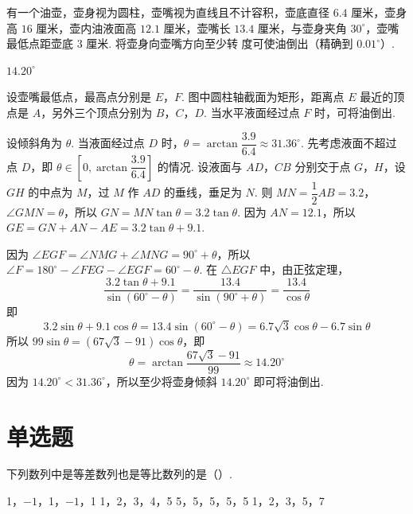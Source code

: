 \documentclass[UTF8,a4paper,oneside,11pt]{ctexbook}
\begin{document}
\begin{problem}
有一个油壶，壶身视为圆柱，壶嘴视为直线且不计容积，壶底直径 \(6.4\text{ 厘米}\)，壶身高 \(16\text{ 厘米}\)，壶内油液面高 \(12.1\text{ 厘米}\)，壶嘴长 \(13.4\text{ 厘米}\)，与壶身夹角 \(30^\circ\)，壶嘴最低点距壶底 \(3\text{ 厘米}\). 将壶身向壶嘴方向至少转\fillinblank{}\(\text{ 度}\)可使油倒出（精确到 \(0.01^\circ\)）.

\end{problem}

\begin{answer}
\(14.20^\circ\)
\end{answer}

\begin{solution}

设壶嘴最低点，最高点分别是 \(E\)，\(F\). 图中圆柱轴截面为矩形，距离点 \(E\) 最近的顶点是 \(A\)，另外三个顶点分别为 \(B\)，\(C\)，\(D\). 当水平液面经过点 \(F\) 时，可将油倒出.

设倾斜角为 \(\theta\). 当液面经过点 \(D\) 时，\(\theta=\arctan\dfrac{3.9}{6.4}\approx31.36^\circ\). 先考虑液面不超过点 \(D\)，即 \(\theta\in\left[0,\arctan\dfrac{3.9}{6.4}\right]\) 的情况. 设液面与 \(AD\)，\(CB\) 分别交于点 \(G\)，\(H\)，设 \(GH\) 的中点为 \(M\)，过 \(M\) 作 \(AD\) 的垂线，垂足为 \(N\). 则 \(MN=\dfrac12AB=3.2\)，\(\angle GMN=\theta\)，所以 \(GN=MN\tan\theta=3.2\tan\theta\). 因为 \(AN=12.1\)，所以 \(GE=GN+AN-AE=3.2\tan\theta+9.1\).

因为 \(\angle EGF=\angle NMG+\angle MNG=90^\circ+\theta\)，所以 \(\angle F=180^\circ-\angle FEG-\angle EGF=60^\circ-\theta\). 在 \(\triangle EGF\) 中，由正弦定理，
\[
\frac{3.2\tan\theta+9.1}{\sin(60^\circ-\theta)}
=\frac{13.4}{\sin(90^\circ+\theta)}
=\frac{13.4}{\cos\theta}
\]
即
\[
3.2\sin\theta+9.1\cos\theta
=13.4\sin(60^\circ-\theta)
=6.7\sqrt3\cos\theta-6.7\sin\theta
\]
所以 \(99\sin\theta=(67\sqrt3-91)\cos\theta\)，即
\[
\theta=\arctan\frac{67\sqrt3-91}{99}\approx14.20^\circ
\]
因为 \(14.20^\circ<31.36^\circ\)，所以至少将壶身倾斜 \(14.20^\circ\) 即可将油倒出.
\end{solution}

\section{单选题}

\begin{problem}
下列数列中是等差数列也是等比数列的是（\quad）.

\choices
    {1，\(-1\)，1，\(-1\)，1}
    {1，2，3，4，5}
    {5，5，5，5，5}
    {1，2，3，5，7}
\end{problem}
\end{document}
